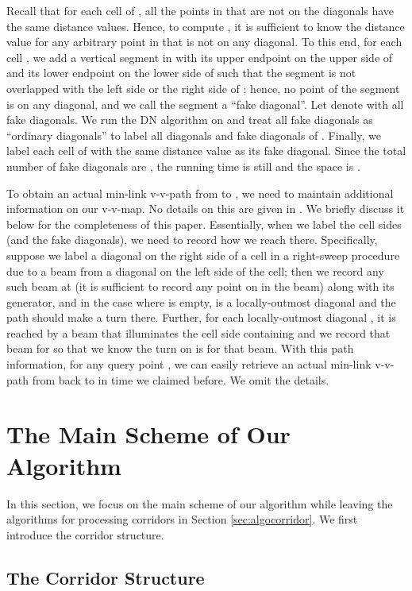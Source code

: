 \documentclass[english,runningheads,11pt]{llncs-revised}
\begin{document}
Recall that for each cell  of , all the points
in  that are not on the diagonals have the same distance values.
Hence, to compute , it is sufficient to know the distance
value for any arbitrary point in  that is not on any diagonal. To this end,
for each cell , we add a
vertical segment in  with its upper endpoint on the upper side of
 and its lower endpoint on the lower side of  such that the
segment is not overlapped with the left side or the right side of ;
hence, no point of the segment is on any diagonal, and
we call the segment a ``fake diagonal''. Let  denote
 with all fake diagonals.
We run the DN algorithm on  and treat all fake diagonals
as ``ordinary diagonals'' to label all diagonals and fake diagonals of
. Finally, we label each cell of
 with the same distance value as its fake diagonal.
Since the total number of fake diagonals are , the running time is still
 and the space is .

To obtain an actual min-link v-v-path from  to , we need to
maintain additional information on our v-v-map. No details
on this are given in \cite{ref:DasGe91}.
We briefly discuss it below for the completeness
of this paper. Essentially, when we
label the cell sides (and the fake diagonals), we need to record how
we reach there. Specifically, suppose we label a diagonal  on the
right side of a cell in a right-sweep procedure due
to a beam from a diagonal on the left side of the cell; then we record any such
beam at  (it is sufficient to record any
point on  in the beam) along with its
generator, and in the case where  is empty,
 is a locally-outmost diagonal and the path should make a turn
there. Further, for each locally-outmost diagonal , it is reached by a beam that illuminates the
cell side containing  and we record that beam for  so that we know the turn on  is for that beam.
With this path information, for any query point ,
we can easily retrieve an actual
min-link v-v-path from  back to  in time we claimed before. We omit the
details.


\section{The Main Scheme of Our Algorithm}
\label{sec:mainscheme}



In this section, we focus on the main scheme of our algorithm while leaving
the algorithms for processing corridors in
Section \ref{sec:algocorridor}. We first introduce the corridor
structure.

\subsection{The Corridor Structure}
\label{sec:corridor}
\end{document}
